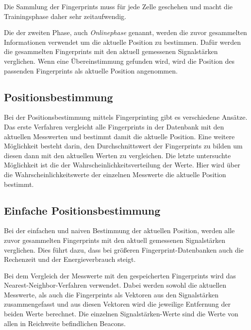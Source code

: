 Die Sammlung der Fingerprints muss für jede Zelle geschehen und macht die Trainingsphase daher sehr zeitaufwendig. 

Die der zweiten Phase, auch \emph{Onlinephase} genannt, werden die zuvor gesammelten Informationen verwendet um die aktuelle Position zu bestimmen. 
Dafür werden die gesammelten Fingerprints mit den aktuell gemessenen Signalstärken verglichen. Wenn eine Übereinstimmung gefunden wird, wird die Position des passenden Fingerprints als aktuelle Position angenommen.


\subsection{Positionsbestimmung}
\label{sec:implementation:fingerprinting:positioning}
Bei der Positionsbestimmung mittels Fingerprinting gibt es verschiedene Ansätze.
Das erste Verfahren vergleicht alle Fingerprints in der Datenbank mit den aktuellen Messwerten und bestimmt damit die aktuelle Position.
Eine weitere Möglichkeit besteht darin, den Durchschnittswert der Fingerprints zu bilden um diesen dann mit den aktuellen Werten zu vergleichen.
Die letzte untersuchte Möglichkeit ist die der Wahrscheinlichkeitsverteilung der Werte. Hier wird über die Wahrscheinlichkeitswerte der einzelnen Messwerte die aktuelle Position bestimmt.

\subsection{Einfache Positionsbestimmung}
\label{sec:implementation:fingerprinting:positioning:naiv}
Bei der einfachen und naiven Bestimmung der aktuellen Position, werden alle zuvor gesammelten Fingerprints mit den aktuell gemessenen Signalstärken verglichen. Dies führt dazu, dass bei größeren Fingerprint-Datenbanken auch die Rechenzeit und der Energieverbrauch steigt. 

Bei dem Vergleich der Messwerte mit den gespeicherten Fingerprints wird das Nearest-Neighbor-Verfahren verwendet. Dabei werden sowohl die aktuellen Messwerte, als auch die Fingerprints als Vektoren aus den Signalstärken zusammengefasst und aus diesen Vektoren wird die jeweilige Entfernung der beiden Werte berechnet. Die einzelnen Signalstärken-Werte sind die Werte von allen in Reichweite befindlichen Beacons.

